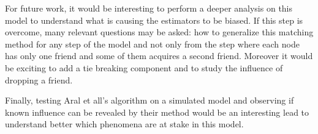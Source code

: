 \documentclass[11pt]{article}
\begin{document}
For future work, it would be interesting to perform a deeper analysis on this model to understand what is causing the estimators to be biased. If this step is overcome, many relevant questions may be asked: how to generalize this matching method for any step of the model and not only from the step where each node has only one friend and some of them acquires a second friend. Moreover it would be exciting to add a tie breaking component and to study the influence of dropping a friend.

Finally, testing Aral et all’s algorithm on a simulated model and observing if known influence can be revealed by their method would be an interesting lead to understand better which phenomena are at stake in this model.
	

\newpage


\nocite{*}
\end{document}

